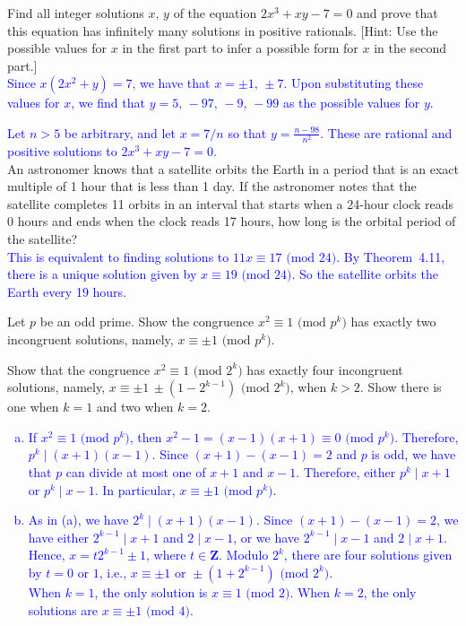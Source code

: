 \documentclass[a4paper,11pt]{article}
\theoremstyle{mythm}
\theoremstyle{mydef}
\newcommand{\blue}[1]{\textcolor{blue}{#1}}
\renewcommand{\pmod}[1]{\text{ (mod $#1$)}}
\newcommand{\Z}{\mathbf{Z}}
\begin{document}
 Find all integer solutions $x,\,y$ of the equation
$2x^3+xy-7=0$ and prove that this equation has infinitely many solutions in
positive rationals. [Hint: Use the possible values for $x$ in the first part to
infer a possible form for $x$ in the second part.] \\

\blue{Since $x(2x^2+y)=7$, we have that $x=\pm1,\,\pm7$. Upon substituting
  these values for $x$, we find that $y=5,\,-97,\,-9,\,-99$ as the possible
  values for $y$.}

\blue{Let $n>5$ be arbitrary, and let $x=7/n$ so that $y=\frac{n-98}{n^2}$.
  These are rational and positive solutions to $2x^3+xy-7=0$.} \\

 An astronomer knows that a satellite orbits the
Earth in a period that is an exact multiple of 1 hour that is less than 1 day.
If the astronomer notes that the satellite completes 11 orbits in an interval
that starts when a 24-hour clock reads 0 hours and ends when the clock reads 17
hours, how long is the orbital period of the satellite? \\

\blue{This is equivalent to finding solutions to $11x \equiv 17 \pmod{24}$. By
  Theorem~4.11, there is a unique solution given by $x \equiv 19 \pmod{24}$. So
  the satellite orbits the Earth every 19 hours.} \\

\begin{enumerate*}[{\bf (a)}]
\item Let $p$ be an odd prime. Show the congruence $x^2 \equiv 1\pmod{p^k}$ has
  exactly two incongruent solutions, namely, $x \equiv \pm1 \pmod{p^k}$.
\item Show that the congruence $x^2 \equiv 1 \pmod{2^k}$ has exactly four
  incongruent solutions, namely, $x \equiv \pm1\,\pm(1-2^{k-1}) \pmod{2^k}$,
  when $k>2$. Show there is one when $k=1$ and two when $k=2$.
\end{enumerate*}

\blue{
  \begin{enumerate}[(a)]
  \item If $x^2 \equiv 1 \pmod{p^k}$, then $x^2-1 = (x-1)(x+1) \equiv 0
    \pmod{p^k}$. Therefore, $p^k \mid (x+1)(x-1)$. Since $(x+1)-(x-1)=2$ and $p$
    is odd, we have that $p$ can divide at most one of $x+1$ and $x-1$.
    Therefore, either $p^k \mid x+1$ or $p^k \mid x-1$. In particular, $x \equiv
    \pm1\pmod{p^k}$.
  \item As in (a), we have $2^k \mid (x+1)(x-1)$. Since $(x+1)-(x-1)=2$, we have
    either $2^{k-1} \mid x+1$ and $2 \mid x-1$, or we have $2^{k-1} \mid x-1$
    and $2 \mid x+1$. Hence, $x=t2^{k-1} \pm 1$, where $t \in \Z$. Modulo $2^k$,
    there are four solutions given by $t=0\text{ or }1$, i.e., $x \equiv
    \pm1\text{ or }\pm(1+2^{k-1}) \pmod{2^k}$. \\
    When $k=1$, the only solution is $x \equiv 1 \pmod{2}$. When $k=2$, the only
    solutions are $x \equiv \pm1\pmod{4}$.
  \end{enumerate}
}
\end{document}
